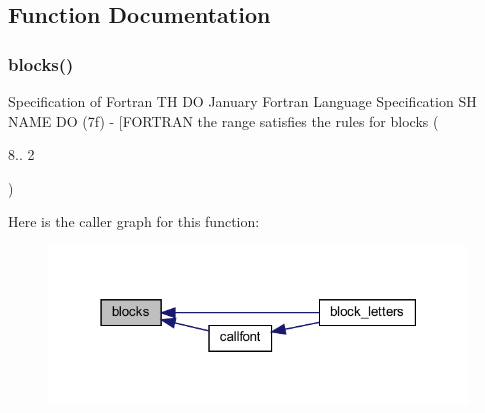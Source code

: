 \subsection{Function Documentation}
\mbox{\label{do_87_8txt_addf9a264ccc8c65a4995cf34906eff5c}} 
\subsubsection{\texorpdfstring{blocks()}{blocks()}}
{\footnotesize\ttfamily Specification of Fortran TH DO January Fortran Language Specification SH N\+A\+ME DO (7f) -\/ \mbox{[}\+F\+O\+R\+T\+R\+A\+N the range satisfies the rules for blocks (\begin{DoxyParamCaption}\item[{8.\+1.}]{2 }\end{DoxyParamCaption})}

Here is the caller graph for this function\+:
\nopagebreak
\begin{figure}[H]
\begin{center}
\leavevmode
\includegraphics[width=316pt]{do_87_8txt_addf9a264ccc8c65a4995cf34906eff5c_icgraph}
\end{center}
\end{figure}
\mbox{\label{do_87_8txt_aec67685fc467311079a688489f5e96ca}} 
